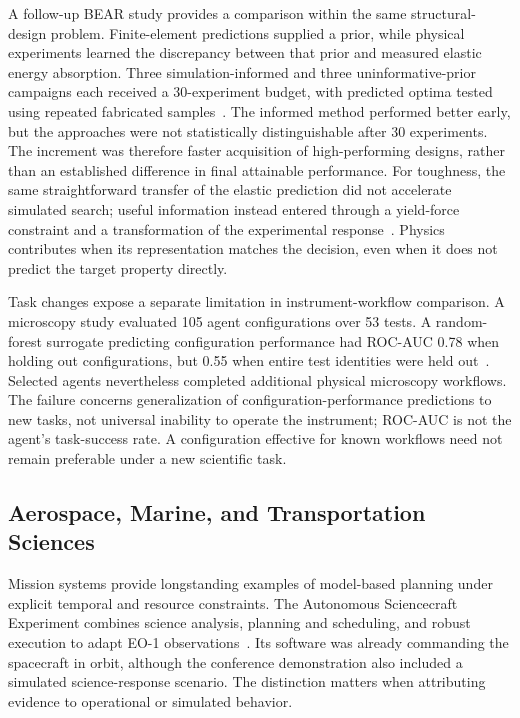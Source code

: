 A follow-up BEAR study provides a comparison within the same structural-design problem. Finite-element predictions supplied a prior, while physical experiments learned the discrepancy between that prior and measured elastic energy absorption. Three simulation-informed and three uninformative-prior campaigns each received a 30-experiment budget, with predicted optima tested using repeated fabricated samples~\cite{asd0615}. The informed method performed better early, but the approaches were not statistically distinguishable after 30 experiments. The increment was therefore faster acquisition of high-performing designs, rather than an established difference in final attainable performance. For toughness, the same straightforward transfer of the elastic prediction did not accelerate simulated search; useful information instead entered through a yield-force constraint and a transformation of the experimental response~\cite{asd0615}. Physics contributes when its representation matches the decision, even when it does not predict the target property directly.

Task changes expose a separate limitation in instrument-workflow comparison. A microscopy study evaluated 105 agent configurations over 53 tests. A random-forest surrogate predicting configuration performance had ROC-AUC 0.78 when holding out configurations, but 0.55 when entire test identities were held out~\cite{asd1009}. Selected agents nevertheless completed additional physical microscopy workflows. The failure concerns generalization of configuration-performance predictions to new tasks, not universal inability to operate the instrument; ROC-AUC is not the agent's task-success rate. A configuration effective for known workflows need not remain preferable under a new scientific task.

\subsection{Aerospace, Marine, and Transportation Sciences}

Mission systems provide longstanding examples of model-based planning under explicit temporal and resource constraints. The Autonomous Sciencecraft Experiment combines science analysis, planning and scheduling, and robust execution to adapt EO-1 observations~\cite{asd0645}. Its software was already commanding the spacecraft in orbit, although the conference demonstration also included a simulated science-response scenario. The distinction matters when attributing evidence to operational or simulated behavior.

